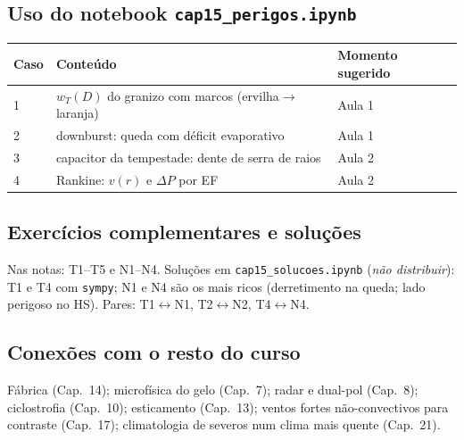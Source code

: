 \subsection*{Uso do notebook \texttt{cap15\_perigos.ipynb}}

\begin{center}
\begin{tabular}{lll}
\hline
Caso & Conteúdo & Momento sugerido \\
\hline
1 & $w_T(D)$ do granizo com marcos (ervilha$\to$laranja) & Aula 1 \\
2 & downburst: queda com déficit evaporativo & Aula 1 \\
3 & capacitor da tempestade: dente de serra de raios & Aula 2 \\
4 & Rankine: $v(r)$ e $\Delta P$ por EF & Aula 2 \\
\hline
\end{tabular}
\end{center}

\subsection*{Exercícios complementares e soluções}

Nas notas: T1--T5 e N1--N4. Soluções em \texttt{cap15\_solucoes.ipynb}
(\emph{não distribuir}): T1 e T4 com \texttt{sympy}; N1 e N4 são os
mais ricos (derretimento na queda; lado perigoso no HS). Pares:
T1$\leftrightarrow$N1, T2$\leftrightarrow$N2, T4$\leftrightarrow$N4.

\subsection*{Conexões com o resto do curso}

Fábrica (Cap.~14); microfísica do gelo (Cap.~7); radar e dual-pol
(Cap.~8); ciclostrofia (Cap.~10); esticamento (Cap.~13); ventos fortes
não-convectivos para contraste (Cap.~17); climatologia de severos num
clima mais quente (Cap.~21).
